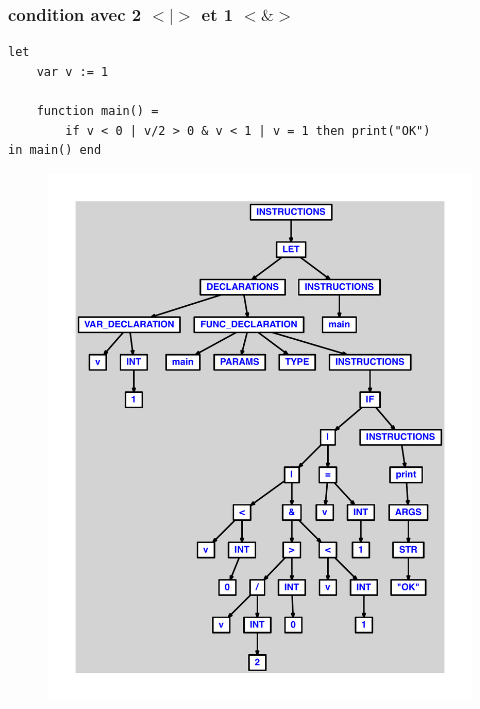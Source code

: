 \documentclass{article}
\begin{document}
\subsubsection{condition avec 2 $ < $$ | $$ > $ et 1 $ < $$ \& $$ > $}
\begin{lstlisting}
let
	var v := 1

	function main() =
		if v < 0 | v/2 > 0 & v < 1 | v = 1 then print("OK")
in main() end
\end{lstlisting}
\newpage
\begin{figure}[H]
\centering
\includegraphics[max width=\textwidth]{ast/ast_285.pdf}
\end{figure}
\newpage
\end{document}
